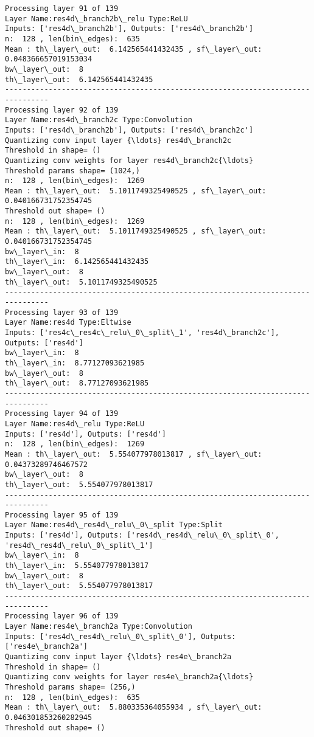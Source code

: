 \documentclass[11pt]{article}
\begin{document}
\begin{Verbatim}[commandchars=\\\{\}]
Processing layer 91 of 139
Layer Name:res4d\_branch2b\_relu Type:ReLU
Inputs: ['res4d\_branch2b'], Outputs: ['res4d\_branch2b']
n:  128 , len(bin\_edges):  635
Mean : th\_layer\_out:  6.142565441432435 , sf\_layer\_out:  0.048366657019153034
bw\_layer\_out:  8
th\_layer\_out:  6.142565441432435
--------------------------------------------------------------------------------
Processing layer 92 of 139
Layer Name:res4d\_branch2c Type:Convolution
Inputs: ['res4d\_branch2b'], Outputs: ['res4d\_branch2c']
Quantizing conv input layer {\ldots} res4d\_branch2c
Threshold in shape= ()
Quantizing conv weights for layer res4d\_branch2c{\ldots}
Threshold params shape= (1024,)
n:  128 , len(bin\_edges):  1269
Mean : th\_layer\_out:  5.1011749325490525 , sf\_layer\_out:  0.040166731752354745
Threshold out shape= ()
n:  128 , len(bin\_edges):  1269
Mean : th\_layer\_out:  5.1011749325490525 , sf\_layer\_out:  0.040166731752354745
bw\_layer\_in:  8
th\_layer\_in:  6.142565441432435
bw\_layer\_out:  8
th\_layer\_out:  5.1011749325490525
--------------------------------------------------------------------------------
Processing layer 93 of 139
Layer Name:res4d Type:Eltwise
Inputs: ['res4c\_res4c\_relu\_0\_split\_1', 'res4d\_branch2c'], Outputs: ['res4d']
bw\_layer\_in:  8
th\_layer\_in:  8.77127093621985
bw\_layer\_out:  8
th\_layer\_out:  8.77127093621985
--------------------------------------------------------------------------------
Processing layer 94 of 139
Layer Name:res4d\_relu Type:ReLU
Inputs: ['res4d'], Outputs: ['res4d']
n:  128 , len(bin\_edges):  1269
Mean : th\_layer\_out:  5.554077978013817 , sf\_layer\_out:  0.04373289746467572
bw\_layer\_out:  8
th\_layer\_out:  5.554077978013817
--------------------------------------------------------------------------------
Processing layer 95 of 139
Layer Name:res4d\_res4d\_relu\_0\_split Type:Split
Inputs: ['res4d'], Outputs: ['res4d\_res4d\_relu\_0\_split\_0', 'res4d\_res4d\_relu\_0\_split\_1']
bw\_layer\_in:  8
th\_layer\_in:  5.554077978013817
bw\_layer\_out:  8
th\_layer\_out:  5.554077978013817
--------------------------------------------------------------------------------
Processing layer 96 of 139
Layer Name:res4e\_branch2a Type:Convolution
Inputs: ['res4d\_res4d\_relu\_0\_split\_0'], Outputs: ['res4e\_branch2a']
Quantizing conv input layer {\ldots} res4e\_branch2a
Threshold in shape= ()
Quantizing conv weights for layer res4e\_branch2a{\ldots}
Threshold params shape= (256,)
n:  128 , len(bin\_edges):  635
Mean : th\_layer\_out:  5.880335364055934 , sf\_layer\_out:  0.046301853260282945
Threshold out shape= ()

\end{Verbatim}
\end{document}
